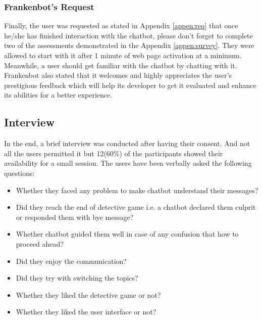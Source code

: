 \subsubsection*{Frankenbot's Request}
Finally, the user was requested as stated in Appendix \ref{appen:req} that once he/she has finished interaction with the chatbot, please don't forget to complete two of the assessments demonstrated in the Appendix \ref{appen:survey}. They were allowed to start with it after 1 minute of web page activation at a minimum. Meanwhile, a user should get familiar with the chatbot by chatting with it. Frankenbot also stated that it welcomes and highly appreciates the user's prestigious feedback which will help its developer to get it evaluated and enhance its abilities for a better experience.

\subsection{Interview\label{subsec:interview}}
In the end, a brief interview was conducted after having their consent. And not all the users permitted it but 12(60\%) of the participants showed their availability for a small session. The users have been verbally asked the following questions:
\begin{itemize}
    \item Whether they faced any problem to make chatbot understand their messages?
    \item Did they reach the end of detective game i.e. a chatbot declared them culprit or responded them with bye message?
    \item Whether chatbot guided them well in case of any confusion that how to proceed ahead?
    \item Did they enjoy the communication?
    \item Did they try with switching the topics?
    \item Whether they liked the detective game or not?
    \item Whether they liked the user interface or not?
\end{itemize}

